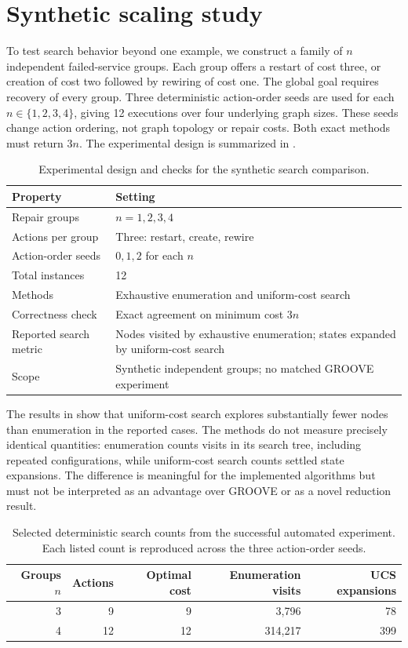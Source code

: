 \documentclass[11pt,a4paper]{article}
\begin{document}
\section{Synthetic scaling study}
To test search behavior beyond one example, we construct a family of $n$ independent failed-service groups. Each group offers a restart of cost three, or creation of cost two followed by rewiring of cost one. The global goal requires recovery of every group. Three deterministic action-order seeds are used for each $n\in\{1,2,3,4\}$, giving 12 executions over four underlying graph sizes. These seeds change action ordering, not graph topology or repair costs. Both exact methods must return $3n$. The experimental design is summarized in .
\begin{table}[H]\centering\caption{Experimental design and checks for the synthetic search comparison.}\label{tab:design}
\begin{tabularx}{\linewidth}{@{}lX@{}}\toprule
Property & Setting\\\midrule
Repair groups & $n=1,2,3,4$\\
Actions per group & Three: restart, create, rewire\\
Action-order seeds & $0,1,2$ for each $n$\\
Total instances & 12\\
Methods & Exhaustive enumeration and uniform-cost search\\
Correctness check & Exact agreement on minimum cost $3n$\\
Reported search metric & Nodes visited by exhaustive enumeration; states expanded by uniform-cost search\\
Scope & Synthetic independent groups; no matched GROOVE experiment\\\bottomrule
\end{tabularx}\end{table}

The results in  show that uniform-cost search explores substantially fewer nodes than enumeration in the reported cases. The methods do not measure precisely identical quantities: enumeration counts visits in its search tree, including repeated configurations, while uniform-cost search counts settled state expansions. The difference is meaningful for the implemented algorithms but must not be interpreted as an advantage over GROOVE or as a novel reduction result.
\begin{table}[H]\centering\caption{Selected deterministic search counts from the successful automated experiment. Each listed count is reproduced across the three action-order seeds.}\label{tab:scaling}
\begin{tabular}{@{}rrrrr@{}}\toprule
Groups $n$ & Actions & Optimal cost & Enumeration visits & UCS expansions\\\midrule
3 & 9 & 9 & 3,796 & 78\\
4 & 12 & 12 & 314,217 & 399\\\bottomrule
\end{tabular}
\end{table}
\end{document}
